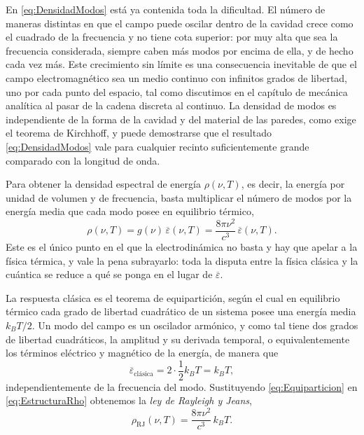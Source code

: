             En \eqref{eq:DensidadModos} está ya contenida toda la dificultad. El número de maneras distintas en que el campo puede oscilar dentro de la cavidad crece como el cuadrado de la frecuencia y no tiene cota superior: por muy alta que sea la frecuencia considerada, siempre caben más modos por encima de ella, y de hecho cada vez más. Este crecimiento sin límite es una consecuencia inevitable de que el campo electromagnético sea un medio continuo con infinitos grados de libertad, uno por cada punto del espacio, tal como discutimos en el capítulo de mecánica analítica al pasar de la cadena discreta al continuo. La densidad de modos es independiente de la forma de la cavidad y del material de las paredes, como exige el teorema de Kirchhoff, y puede demostrarse que el resultado \eqref{eq:DensidadModos} vale para cualquier recinto suficientemente grande comparado con la longitud de onda.

            Para obtener la densidad espectral de energía $\rho(\nu,T)$, es decir, la energía por unidad de volumen y de frecuencia, basta multiplicar el número de modos por la energía media que cada modo posee en equilibrio térmico,
            \begin{equation}\label{eq:EstructuraRho}
                \rho(\nu,T) = g(\nu)\,\overline{\varepsilon}(\nu,T) = \frac{8\pi\nu^{2}}{c^{3}}\,\overline{\varepsilon}(\nu,T).
            \end{equation}
            Este es el único punto en el que la electrodinámica no basta y hay que apelar a la física térmica, y vale la pena subrayarlo: toda la disputa entre la física clásica y la cuántica se reduce a qué se ponga en el lugar de $\overline{\varepsilon}$.

            La respuesta clásica es el teorema de equipartición, según el cual en equilibrio térmico cada grado de libertad cuadrático de un sistema posee una energía media $k_{B}T/2$. Un modo del campo es un oscilador armónico, y como tal tiene dos grados de libertad cuadráticos, la amplitud y su derivada temporal, o equivalentemente los términos eléctrico y magnético de la energía, de manera que
            \begin{equation}\label{eq:Equiparticion}
                \overline{\varepsilon}_{\text{clásica}} = 2\cdot\frac{1}{2}k_{B}T = k_{B}T,
            \end{equation}
            independientemente de la frecuencia del modo. Sustituyendo \eqref{eq:Equiparticion} en \eqref{eq:EstructuraRho} obtenemos la \textit{ley de Rayleigh y Jeans},
            \begin{equation}\label{eq:RayleighJeans}
                \boxed{\;\rho_{\text{RJ}}(\nu,T) = \frac{8\pi\nu^{2}}{c^{3}}\,k_{B}T .\;}
            \end{equation}

